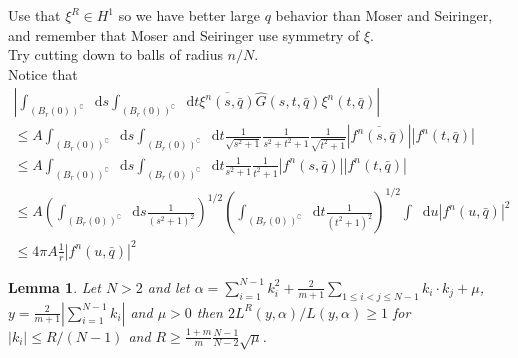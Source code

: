 \documentclass[a4paper,11pt]{article}
\newcommand{\abs}[1]{\left\lvert #1 \right\rvert}
\newcommand*\diff{\mathop{}\!\mathrm{d}}
\newtheorem{lemma}{Lemma}
\numberwithin{equation}{section}
\begin{document}
	Use that $ \xi^R\in H^1 $ so we have better large $ q $ behavior than Moser and Seiringer, and remember that Moser and Seiringer use symmetry of $ \xi $.\\ Try cutting down to balls of radius $ n/N $.\\
	Notice that\begin{equation}
	\begin{aligned}
	\abs{\int_{(B_r(0))^\complement}\diff s\int_{(B_r(0))^\complement}\diff t \overline{\xi^n(s,\bar{q})}\hat{G}(s,t,\bar{q})\xi^n(t,\bar{q})}\\\leq A \int_{(B_r(0))^\complement}\diff s\int_{(B_r(0))^\complement}\diff t \frac{1}{\sqrt{s^2+1}}\frac{1}{s^2+t^2+1}\frac{1}{\sqrt{t^2+1}} \abs{\overline{f^n(s,\bar{q})}}\abs{f^n(t,\bar{q})}\\
	\leq A \int_{(B_r(0))^\complement}\diff s\int_{(B_r(0))^\complement}\diff t \frac{1}{s^2+1}\frac{1}{t^2+1} \abs{f^n(s,\bar{q})}\abs{f^n(t,\bar{q})}\\
	\leq A \left(\int_{(B_r(0))^\complement}\diff s \frac{1}{(s^2+1)^2}\right)^{1/2}\left(\int_{(B_r(0))^\complement}\diff t \frac{1}{(t^2+1)^2} \right)^{1/2}\int \diff u \abs{f^n(u,\bar{q})}^2\\
	\leq 4\pi A \frac{1}{r}\abs{f^n(u,\bar{q})}^2
	\end{aligned}
	\end{equation}
	\begin{lemma}
		Let $ N>2 $ and let $ \alpha=\sum_{i=1}^{N-1}k_i^2+\frac{2}{m+1}\sum_{1\leq i<j\leq N-1}k_i\cdot k_j+\mu $, $ y=\frac{2}{m+1}\abs{\sum_{i=1}^{N-1}k_i} $ and $ \mu>0 $ then $ 2L^R(y,\alpha)/L(y,\alpha)\geq1 $ for $ \abs{k_i}\leq R/(N-1) $ and $ R\geq\frac{1+m}{m}\frac{N-1}{N-2}\sqrt{\mu} $.
	\end{lemma}
\end{document}
